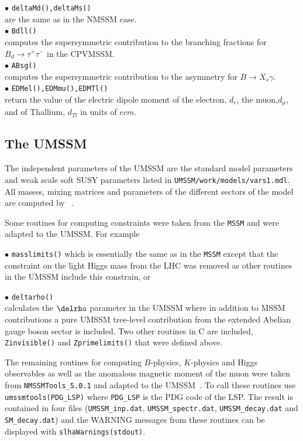 \documentclass[12pt,a4paper]{article}
\begin{document}
\noindent$\bullet$ \verb|deltaMd(),deltaMs()|\\
are the same as in the NMSSM case.\\ 

\noi$\bullet$ \verb|Bdll()|\\
computes the supersymmetric contribution to the branching fractions for
${B}_d\rightarrow\tau^+\tau^-$ in the CPVMSSM.\\ 

\noi$\bullet$ \verb|ABsg()|\\
computes the supersymmetric contribution to the asymmetry for  ${B}\rightarrow X_s\gamma$.\\ 


\noindent$\bullet$ \verb|EDMel(),EDMmu(),EDMTl()|\\
return the  value of the
electric dipole moment of the electron, $d_e$, the muon,$d_\mu$,   
and of Thallium, $d_{Tl}$ in units of $ecm$. 

\subsection{The UMSSM}

The independent parameters of the UMSSM are the standard model
parameters and weak scale soft SUSY parameters listed in \verb|UMSSM/work/models/vars1.mdl|.
All  masses, mixing matrices and parameters of the different sectors of the model
are computed by \micro~\cite{DaSilva:2013jga,Belanger:2015cra}.

Some routines for computing constraints were taken from the {\tt MSSM} and were adapted to the UMSSM. For example

 \noi$\bullet$ \verb|masslimits()|
which is essentially the same as in the {\tt MSSM} except that
the constraint on the light Higgs mass from the LHC was removed
as other routines in the UMSSM include this constrain, or

\noi$\bullet$ \verb|deltarho()|\\
 calculates  the $\delrho$ parameter in the UMSSM where in addition to MSSM contributions
a pure UMSSM tree-level contribution from the extended Abelian gauge boson sector is included.
Two other routines in C are included, \verb|Zinvisible()| and \verb|Zprimelimits()| that were defined above. 


The remaining routines for computing $B$-physics, $K$-physics and Higgs observables as well as the anomalous magnetic moment of the muon
were taken from \verb|NMSSMTools_5.0.1| and adapted to the UMSSM~\cite{DaSilva:2013jga,Domingo:2015wyn}.
To call these routines use \verb|umssmtools(PDG_LSP)| where \verb|PDG_LSP| is the PDG code of the LSP. The result is contained in four files (\verb|UMSSM_inp.dat|,
\verb|UMSSM_spectr.dat|, \verb|UMSSM_decay.dat| and \verb|SM_decay.dat|) and the WARNING messages from these routines
can be displayed with \verb|slhaWarnings(stdout)|.
\end{document}
